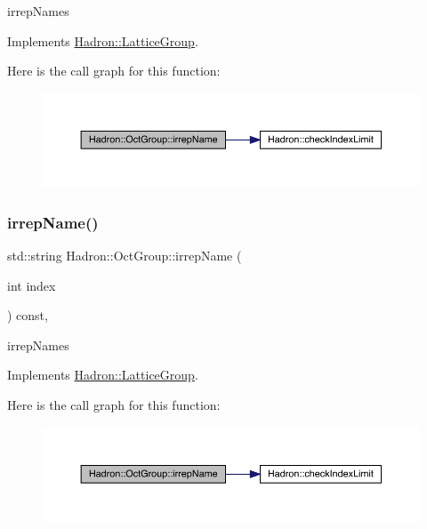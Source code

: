irrep\+Names 

Implements \mbox{\hyperlink{structHadron_1_1LatticeGroup_a4bc5620218c2a73157e19bc4451fe746}{Hadron\+::\+Lattice\+Group}}.

Here is the call graph for this function\+:
\nopagebreak
\begin{figure}[H]
\begin{center}
\leavevmode
\includegraphics[width=350pt]{d1/de5/structHadron_1_1OctGroup_a58f84ff32d1dce2277f3b9da9d35d594_cgraph}
\end{center}
\end{figure}
\mbox{\label{structHadron_1_1OctGroup_a58f84ff32d1dce2277f3b9da9d35d594}} 
\subsubsection{\texorpdfstring{irrepName()}{irrepName()}\hspace{0.1cm}{\footnotesize\ttfamily [3/3]}}
{\footnotesize\ttfamily std\+::string Hadron\+::\+Oct\+Group\+::irrep\+Name (\begin{DoxyParamCaption}\item[{int}]{index }\end{DoxyParamCaption}) const\hspace{0.3cm}{\ttfamily [inline]}, {\ttfamily [virtual]}}

irrep\+Names 

Implements \mbox{\hyperlink{structHadron_1_1LatticeGroup_a4bc5620218c2a73157e19bc4451fe746}{Hadron\+::\+Lattice\+Group}}.

Here is the call graph for this function\+:
\nopagebreak
\begin{figure}[H]
\begin{center}
\leavevmode
\includegraphics[width=350pt]{d1/de5/structHadron_1_1OctGroup_a58f84ff32d1dce2277f3b9da9d35d594_cgraph}
\end{center}
\end{figure}
\mbox{\label{structHadron_1_1OctGroup_ab3c3d81d578cac614b1ccdd456f8ea59}} 
